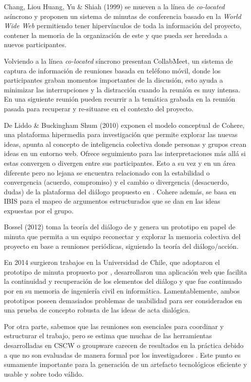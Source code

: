 Chang, Liou Huang, Yu \& Shiah (1999) se mueven a la línea de \textit{co-located} asíncrono y proponen un sistema de minutas de conferencia basado en la \textit{World Wide Web} permitiendo tener hipervínculos de toda la información del proyecto, contener la memoria de la organización de este y que pueda ser heredada a nuevos participantes.

Volviendo a la línea \textit{co-located} síncrono  presentan CollabMeet, un sistema de captura de información de reuniones basada en teléfono móvil, donde los participantes graban momentos importantes de la discusión, esto ayuda a minimizar las interrupciones y la distracción cuando la reunión es muy intensa. En una siguiente reunión pueden recurrir a la temática grabada en la reunión pasada para recuperar y re-situarse en el contexto del proyecto.

De Liddo \& Buckingham Shum (2010) exponen el modelo conceptual de Cohere, una plataforma hipermedia para investigación que permite explorar las nuevas ideas, apunta al concepto de inteligencia colectiva donde personas y grupos crean ideas en un entorno web. Ofrece seguimiento para las interpretaciones más allá si estas convergen o divergen entre sus participantes. Esto a su vez y en un área diferente pero no lejana se encuentra relacionado con la estabilidad o convergencia (acuerdo, compromiso) y el cambio o divergencia (desacuerdo, dudas) de la plataforma del diálogo propuesto en . Cohere además, se basa en IBIS para el mapeo de argumentos estructurados que se dan en las ideas expuestas por el grupo.

Bossel (2012) toma la teoría del diálogo de  y genera un prototipo en papel de minuta que permita a un equipo reconectar y explorar la memoria colectiva del proyecto en base a reuniones periódicas, siguiendo la teoría del diálogo/acción.

En 2014 surgieron trabajos en la Universidad de Chile, que adoptaron el prototipo de minuta propuesto por , desarrollaron una aplicación web que facilita la continuidad y recuperación de los elementos del diálogo  y que fue continuado por  en su memoria de ingeniería civil en informática. Lamentablemente, ambos prototipos poseen demasiados problemas de usabilidad para ser considerados en una prueba de concepto robusta de las ideas de acta dialógica.

Por otra parte, sabemos que las reuniones son esenciales para coordinar y estructurar el trabajo, pero se estima que muchas de las herramientas desarrolladas en CSCW o groupware carecen de resultados en la práctica  debido a que no son evaluadas de manera formal por los investigadores . Este punto es sumamente importante para la generación de un artefacto tecnológicos eficiente y usable y sobre todo válido.

